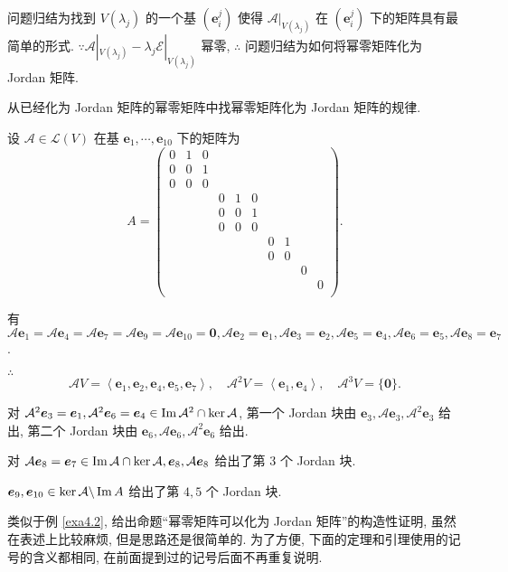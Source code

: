 \documentclass[color=black,device=normal,lang=cn,mode=geye]{elegantnote}
\begin{document}
问题归结为找到 $V(\lambda_j)$ 的一个基 $(\boldsymbol{e}^j_i)$ 使得 $\mathcal{A}|_{V(\lambda_j)}$ 在 $(\boldsymbol{e}^j_i)$ 下的矩阵具有最简单的形式. $\because\mathcal{A}|_{V(\lambda_j)}-\lambda_j\mathcal{E}|_{V(\lambda_j)}$ 幂零, $\therefore$ 问题归结为如何将幂零矩阵化为 Jordan 矩阵.

从已经化为 Jordan 矩阵的幂零矩阵中找幂零矩阵化为 Jordan 矩阵的规律.
\begin{example}\label{exa4.2}
    设 $\mathcal{A}\in\mathcal{L}(V)$ 在基 $\boldsymbol{e}_1,\cdots,\boldsymbol{e}_{10}$ 下的矩阵为
    \[A=\begin{pmatrix}
        0 & 1 & 0 \\
        0 & 0 & 1 \\
        0 & 0 & 0 \\
        &&& 0 & 1 & 0 \\
        &&& 0 & 0 & 1 \\
        &&& 0 & 0 & 0 \\
        &&&&&& 0 & 1 \\
        &&&&&& 0 & 0 \\
        &&&&&&&& 0 \\
        &&&&&&&&& 0 \\
    \end{pmatrix}.\]

    有 $\mathcal{A}\boldsymbol{e}_1=\mathcal{A}\boldsymbol{e}_4=\mathcal{A}\boldsymbol{e}_7=\mathcal{A}\boldsymbol{e}_9=\mathcal{A}\boldsymbol{e}_{10}=\boldsymbol{0},\mathcal{A}\boldsymbol{e}_2=\boldsymbol{e}_1,\mathcal{A}\boldsymbol{e}_3=\boldsymbol{e}_2,\mathcal{A}\boldsymbol{e}_5=\boldsymbol{e}_4,\mathcal{A}\boldsymbol{e}_6=\boldsymbol{e}_5,\mathcal{A}\boldsymbol{e}_8=\boldsymbol{e}_7$.

    $\therefore$
    \[\mathcal{A}V=\left<\boldsymbol{e}_1,\boldsymbol{e}_2,\boldsymbol{e}_4,\boldsymbol{e}_5,\boldsymbol{e}_7\right>,\quad\mathcal{A}^2V=\left<\boldsymbol{e}_1,\boldsymbol{e}_4\right>,\quad\mathcal{A}^3V=\{\boldsymbol{0}\}.\]

    对 $\mathcal{A}^2\boldsymbol{e}_3=\boldsymbol{e}_1,\mathcal{A}^2\boldsymbol{e}_6=\boldsymbol{e}_4\in\operatorname{Im} \mathcal{A}^2\cap\ker\mathcal{A}$, 第一个 Jordan 块由 $\boldsymbol{e}_3,\mathcal{A}\boldsymbol{e}_3,\mathcal{A}^2\boldsymbol{e}_3$ 给出, 第二个 Jordan 块由 $\boldsymbol{e}_6,\mathcal{A}\boldsymbol{e}_6,\mathcal{A}^2\boldsymbol{e}_6$ 给出.

    对 $\mathcal{A}\boldsymbol{e}_8=\boldsymbol{e}_7\in\operatorname{Im} \mathcal{A}\cap\ker\mathcal{A},\boldsymbol{e}_8,\mathcal{A}\boldsymbol{e}_8$ 给出了第 $3$ 个 Jordan 块.

    $\boldsymbol{e}_9,\boldsymbol{e}_{10}\in\ker\mathcal{A}\backslash\operatorname{Im} A$ 给出了第 $4,5$ 个 Jordan 块.
\end{example}
类似于例 \ref{exa4.2}, 给出命题``幂零矩阵可以化为 Jordan 矩阵''的构造性证明, 虽然在表述上比较麻烦, 但是思路还是很简单的. 为了方便, 下面的定理和引理使用的记号的含义都相同, 在前面提到过的记号后面不再重复说明.
\end{document}
